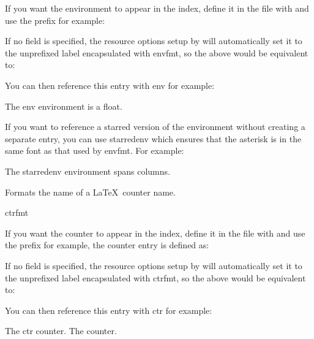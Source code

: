 \documentclass[toc=listof]{scrreport}
\begin{document}
If you want the environment to appear in the index, define it in
the  file with  and use the prefix
 for example:
\begin{codebox}
\end{codebox}
If no  field is specified, the resource options setup by
 will automatically set it to the unprefixed label
encapsulated with \gls{envfmt}, so the above would be equivalent to:
\begin{codebox}
\end{codebox}
You can then reference this entry with \gls{env} for example:
\begin{codebox}
The \gls{env} environment is a float.
\end{codebox}
If you want to reference a starred version of the environment
without creating a separate entry, you can use \gls{starredenv}
which ensures that the asterisk is in the same font as that used by
\gls{envfmt}. For example:
\begin{codebox}
The \gls{starredenv} environment spans columns.
\end{codebox}

Formats the name of a \LaTeX\ counter name.
\begin{coderesult}
\gls{ctrfmt}
\tcblower
{}
\end{coderesult}

If you want the counter to appear in the index, define it in
the  file with  and use the prefix
 for example, the  counter entry is defined as:
\begin{codebox}
\end{codebox}
If no  field is specified, the resource options setup by
 will automatically set it to the unprefixed label
encapsulated with \gls{ctrfmt}, so the above would be equivalent to:
\begin{codebox}
\end{codebox}
You can then reference this entry with \gls{ctr} for example:
\begin{coderesult}
The \gls{ctr} counter.
\tcblower
The  counter.
\end{coderesult}
\end{document}
